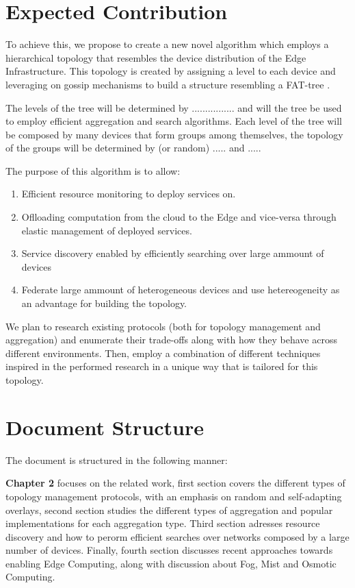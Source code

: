 
\section{Expected Contribution}

To achieve this, we propose to create a new novel algorithm which employs a hierarchical topology
that resembles the device distribution of the Edge Infrastructure. This topology is created by
assigning a level to each device and leveraging on gossip mechanisms to build a structure resembling a FAT-tree \cite{}.

The levels of the tree will be determined by ................ and will the tree be used to employ
efficient aggregation and search algorithms. Each level of the tree will be composed by many devices that form groups 
among themselves, the topology of the groups will be determined by (or random) ..... and ..... 

The purpose of this algorithm is to allow:

\begin{enumerate} 
    \item Efficient resource monitoring to deploy services on.
    \item Oflloading computation from the cloud to the Edge and vice-versa through elastic management of deployed services.
    \item Service discovery enabled by efficiently searching over large ammount of devices
    \item Federate large ammount of heterogeneous devices and use hetereogeneity as an advantage for building the topology.
\end{enumerate}

We plan to research existing protocols (both for topology management and aggregation)
and enumerate their trade-offs along with how they behave across different environments. 
Then, employ a combination of different techniques inspired in the performed research 
in a unique way that is tailored for this topology.

\section{Document Structure}

The document is structured in the following manner:

\textbf{Chapter 2} focuses on the related work, first section covers the different types of topology management protocols,
with an emphasis on random and self-adapting overlays, second section studies the different types of aggregation and  
popular implementations for each aggregation type. Third section adresses resource discovery and how to perorm efficient 
searches over networks composed by a large number of devices. Finally, fourth section discusses recent approaches towards enabling
Edge Computing, along with discussion about Fog, Mist and Osmotic Computing.


